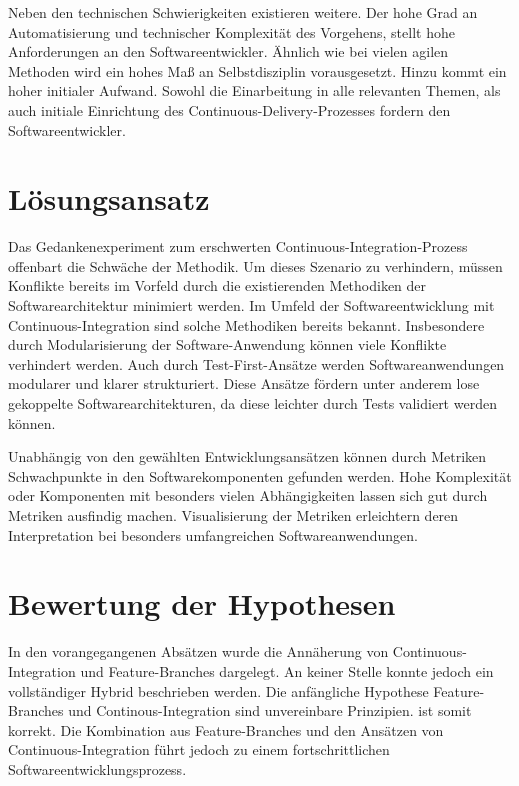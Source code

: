 Neben den technischen Schwierigkeiten existieren weitere. Der hohe Grad an Automatisierung und technischer Komplexität des Vorgehens, stellt hohe Anforderungen an den Softwareentwickler. Ähnlich wie bei vielen agilen Methoden wird ein hohes Maß an Selbstdisziplin vorausgesetzt. Hinzu kommt ein hoher initialer Aufwand. Sowohl die Einarbeitung in alle relevanten Themen, als auch initiale Einrichtung des Continuous-Delivery-Prozesses fordern den Softwareentwickler.

\section{Lösungsansatz}

Das Gedankenexperiment zum erschwerten Continuous-Integration-Prozess offenbart die Schwäche der Methodik. Um dieses Szenario zu verhindern, müssen Konflikte bereits im Vorfeld durch die existierenden Methodiken der Softwarearchitektur minimiert werden. Im Umfeld der Softwareentwicklung mit Continuous-Integration sind solche Methodiken bereits bekannt. Insbesondere durch Modularisierung der Software-Anwendung können viele Konflikte verhindert werden. Auch durch Test-First-Ansätze werden Softwareanwendungen modularer und klarer strukturiert. Diese Ansätze fördern unter anderem \glqq lose gekoppelte\grqq{}  Softwarearchitekturen, da diese leichter durch Tests validiert werden können. 

Unabhängig von den gewählten Entwicklungsansätzen können durch Metriken\\ Schwachpunkte in den Softwarekomponenten gefunden werden. Hohe Komplexität oder Komponenten mit besonders vielen Abhängigkeiten lassen sich gut durch Metriken ausfindig machen. Visualisierung der Metriken erleichtern deren Interpretation bei besonders umfangreichen Softwareanwendungen. 

\section{Bewertung der Hypothesen}

In den vorangegangenen Absätzen wurde die Annäherung von Continuous-Integration und Feature-Branches dargelegt. An keiner Stelle konnte jedoch ein vollständiger Hybrid beschrieben werden. Die anfängliche Hypothese \glqq Feature-Branches und Continous-Integration sind unvereinbare Prinzipien.\grqq{} ist somit korrekt. Die Kombination aus Feature-Branches und den Ansätzen von Continuous-Integration führt jedoch zu einem fortschrittlichen Softwareentwicklungsprozess.

